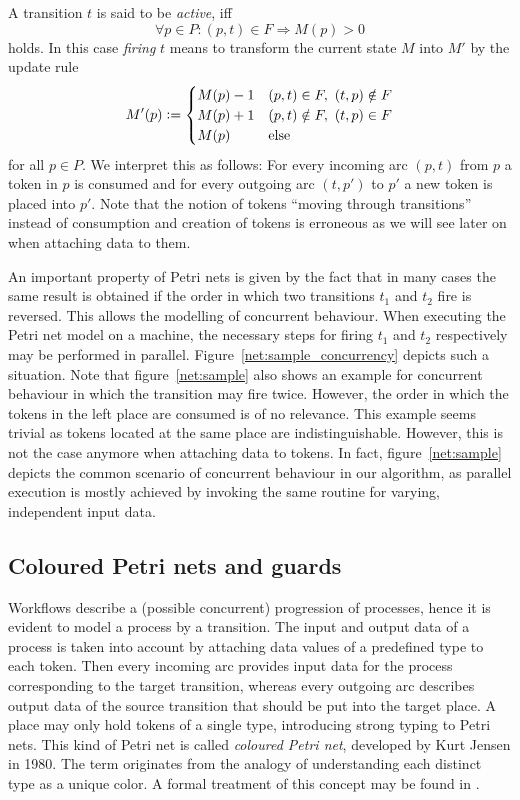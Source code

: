 A transition $t$ is said to be \emph{active}, iff
$$\forall p\in P\colon (p,t)\in F\Rightarrow M(p) > 0$$
holds. In this case \emph{firing} $t$ means to transform the current state $M$ into $M'$ by the update rule
$$M'(p) \mathrel{\mathop:}= \begin{cases}
M(p) - 1 & (p,t)\in F,\ (t,p)\notin F \\
M(p) + 1 & (p,t)\notin F,\ (t,p)\in F \\
M(p) & \text{else}
\end{cases}$$
for all $p\in P$. We interpret this as follows: For every incoming arc $(p,t)$ from $p$ a token in $p$ is consumed and for every outgoing arc $(t, p')$ to $p'$ a new token is placed into $p'$. Note that the notion of tokens ``moving through transitions'' instead of consumption and creation of tokens is erroneous as we will see later on when attaching data to them.



An important property of Petri nets is given by the fact that in many cases the same result is obtained if the order in which two transitions $t_1$ and $t_2$ fire is reversed. This allows the modelling of concurrent behaviour. When executing the Petri net model on a machine, the necessary steps for firing $t_1$ and $t_2$ respectively may be performed in parallel. Figure~\ref{net:sample_concurrency} depicts such a situation. Note that figure~\ref{net:sample} also shows an example for concurrent behaviour in which the transition may fire twice. However, the order in which the tokens in the left place are consumed is of no relevance. This example seems trivial as tokens located at the same place are indistinguishable. However, this is not the case anymore when attaching data to tokens. In fact, figure~\ref{net:sample} depicts the common scenario of concurrent behaviour in our algorithm, as parallel execution is mostly achieved by invoking the same routine for varying, independent input data.

\subsection*{Coloured Petri nets and guards}

Workflows describe a (possible concurrent) progression of processes, hence it is evident to model a process by a transition. The input and output data of a process is taken into account by attaching data values of a predefined type to each token. Then every incoming arc provides input data for the process corresponding to the target transition, whereas every outgoing arc describes output data of the source transition that should be put into the target place. A place may only hold tokens of a single type, introducing strong typing to Petri nets. This kind of Petri net is called \emph{coloured Petri net}, developed by Kurt Jensen in 1980. The term originates from the analogy of understanding each distinct type as a unique color. A formal treatment of this concept may be found in \cite{cp_nets}.

